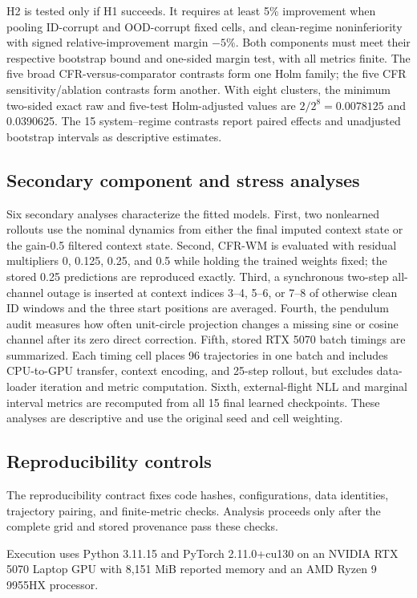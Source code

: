 H2 is tested only if H1 succeeds. It requires at least 5\% improvement when
pooling ID-corrupt and OOD-corrupt fixed cells, and clean-regime
noninferiority with signed relative-improvement margin $-5\%$. Both components
must meet their respective bootstrap bound and one-sided margin test, with all
metrics finite. The five broad CFR-versus-comparator contrasts form one Holm
family; the five CFR sensitivity/ablation contrasts form another. With eight
clusters, the minimum two-sided exact raw and five-test Holm-adjusted values are
$2/2^8=0.0078125$ and 0.0390625. The 15 system--regime contrasts report paired
effects and unadjusted bootstrap intervals as descriptive estimates.

\subsection{Secondary component and stress analyses}

Six secondary analyses characterize the fitted models. First, two nonlearned
rollouts use the nominal dynamics from either the
final imputed context state or the gain-0.5 filtered context state. Second,
CFR-WM is evaluated with residual multipliers 0, 0.125, 0.25, and 0.5 while
holding the trained weights fixed; the stored 0.25 predictions are reproduced
exactly. Third, a synchronous two-step
all-channel outage is inserted at context indices 3--4, 5--6, or 7--8 of
otherwise clean ID windows and the three start positions are averaged. Fourth,
the pendulum audit measures how often unit-circle projection changes a missing
sine or cosine channel after its zero direct correction. Fifth, stored RTX 5070
batch timings are summarized. Each timing cell places 96 trajectories in one
batch and includes CPU-to-GPU transfer, context encoding, and 25-step rollout,
but excludes data-loader iteration and metric computation. Sixth,
external-flight NLL and marginal interval metrics are recomputed from all 15
final learned checkpoints. These analyses are descriptive and use the original
seed and cell weighting.

\subsection{Reproducibility controls}

The reproducibility contract fixes code hashes, configurations, data identities,
trajectory pairing, and finite-metric checks. Analysis proceeds only after the
complete grid and stored provenance pass these checks.

Execution uses Python 3.11.15 and PyTorch 2.11.0+cu130 on an NVIDIA RTX 5070
Laptop GPU with 8,151 MiB reported memory and an AMD Ryzen 9 9955HX processor.
